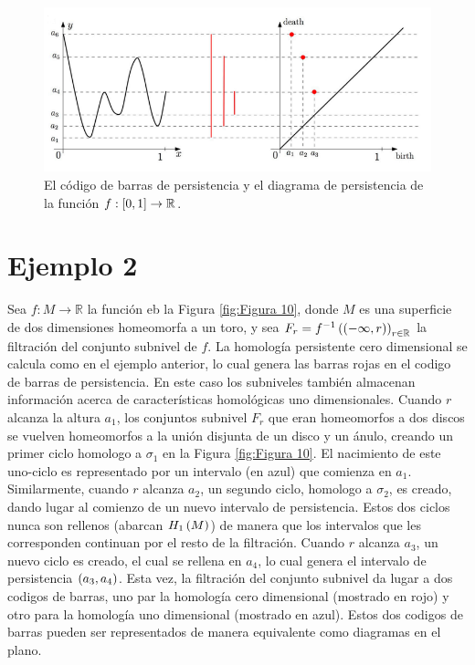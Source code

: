 \begin{figure}[ht]
    \centering
    \includegraphics[width=0.85\linewidth]{./figures/Figura9.png}
    \caption{
        El c\'odigo de barras de persistencia y el diagrama de persistencia de la funci\'on
        $f:\left[0,1\right]\rightarrow\mathbb{R}$.
    }
    \label{fig:Figura 9}
    \vspace{15pt}
\end{figure}

\section*{Ejemplo 2}

Sea $f: M\rightarrow \mathbb{R}$ la funci\'on eb la Figura \ref{fig:Figura 10},
donde $M$ es una superficie de dos dimensiones homeomorfa a un toro,
y sea $F_{r} = f^{-1}\left(\left(-\infty,r\right)\right)_{r\in \mathbb{R}}$ la filtraci\'on del conjunto subnivel de $f$.
La homolog\'ia persistente cero dimensional se calcula como en el ejemplo anterior,
lo cual genera las barras rojas en el codigo de barras de persistencia.
En este caso los subniveles tambi\'en almacenan informaci\'on acerca de caracter\'isticas homol\'ogicas uno dimensionales.
Cuando $r$ alcanza la altura $a_{1}$,
los conjuntos subnivel $F_{r}$ que eran homeomorfos a dos discos se vuelven homeomorfos a la uni\'on disjunta de un disco y un \'anulo,
creando un primer ciclo homologo a $\sigma_{1}$ en la Figura \ref{fig:Figura 10}.
El nacimiento de este uno-ciclo es representado por un intervalo (en azul) que comienza en $a_{1}$.
Similarmente, cuando $r$ alcanza $a_{2}$, un segundo ciclo, homologo a $\sigma_{2}$, es creado,
dando lugar al comienzo de un nuevo intervalo de persistencia.
Estos dos ciclos nunca son rellenos (abarcan $H_{1}\left(M\right)$) de manera que los intervalos que les corresponden continuan por el resto de la filtraci\'on.
Cuando $r$ alcanza $a_{3}$, un nuevo ciclo es creado, el cual se rellena en $a_{4}$,
lo cual genera el intervalo de persistencia $\left(a_{3},a_{4}\right)$.
Esta vez, la filtraci\'on del conjunto subnivel da lugar a dos codigos de barras,
uno par la homolog\'ia cero dimensional (mostrado en rojo) y otro para la homolog\'ia uno dimensional (mostrado en azul).
Estos dos codigos de barras pueden ser representados de manera equivalente como diagramas en el plano. 

